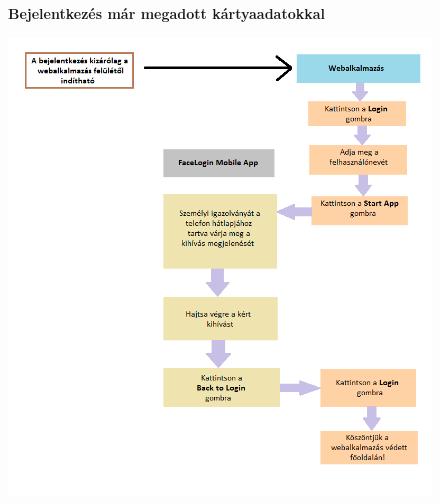 \begin{figure}[h]
 \begin{minipage}{1\textwidth} 
\begin{center} {\textbf{Bejelentkezés már megadott kártyaadatokkal}}
\end{center}

\centering
    \includegraphics[scale=0.7]{img/login}
 \end{minipage}
\end{figure}
\newpage
